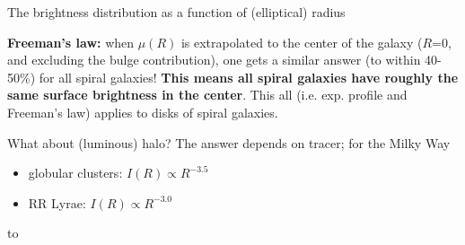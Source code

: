\documentclass[letterpaper,landscape]{slides}
\begin{document}
\begin{slide}
\begin{center}
{\large \color{red} 
       The brightness distribution as a function of (elliptical) radius  }
\end{center}

{\color{blue} \bf Freeman's law:} when $\mu(R)$ is extrapolated
to the center of the galaxy ($R$=0, and excluding the bulge contribution), 
one gets a similar answer (to within 40-50\%) for all spiral galaxies! {\bf This means all spiral galaxies have roughly the same surface brightness in the center}. This all (i.e. exp. profile and Freeman's law) applies to disks of spiral galaxies.

What about (luminous) halo? The answer depends on tracer; for the Milky Way
\begin{itemize}
\item
  {\color{blue} globular clusters}: $I(R) \propto R^{-3.5}$
\item
  {\color{red} RR Lyrae}: $I(R) \propto R^{-3.0}$
\end{itemize}


\vfill
\end{slide}


\begin{slide}

\hbox to 
\vfill 
\end{slide}
\end{document}

